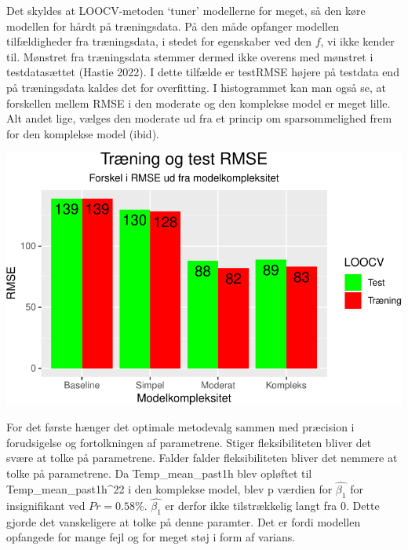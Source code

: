 \documentclass[
  12pt,
  a4paper,
  DIV=11,
  numbers=noendperiod]{scrartcl}
\begin{document}
Det skyldes at LOOCV-metoden `tuner' modellerne for meget, så den køre
modellen for hårdt på træningsdata. På den måde opfanger modellen
tilfældigheder fra træningsdata, i stedet for egenskaber ved den \(f\),
vi ikke kender til. Mønstret fra træningsdata stemmer dermed ikke
overens med mønstret i testdatasættet (Hastie 2022). I dette tilfælde er
testRMSE højere på testdata end på træningsdata kaldes det for
overfitting. I histogrammet kan man også se, at forskellen mellem RMSE i
den moderate og den komplekse model er meget lille. Alt andet lige,
vælges den moderate ud fra et princip om sparsommelighed frem for den
komplekse model (ibid).

\includegraphics{Semester_projekt_2022_G1_files/figure-pdf/Chunk 15 - Histgram over MSE-1.pdf}

For det første hænger det optimale metodevalg sammen med præcision i
forudsigelse og fortolkningen af parametrene. Stiger fleksibiliteten
bliver det svære at tolke på parametrene. Falder falder fleksibiliteten
bliver det nemmere at tolke på parametrene. Da Temp\_mean\_past1h blev
opløftet til Temp\_mean\_past1h\^{}22 i den komplekse model, blev p
værdien for \(\hat{\beta_1}\) for insignifikant ved \(Pr = 0.58\%\).
\(\hat{\beta_1}\) er derfor ikke tilstrækkelig langt fra \(0\). Dette
gjorde det vanskeligere at tolke på denne paramter. Det er fordi
modellen opfangede for mange fejl og for meget støj i form af varians.
\end{document}
